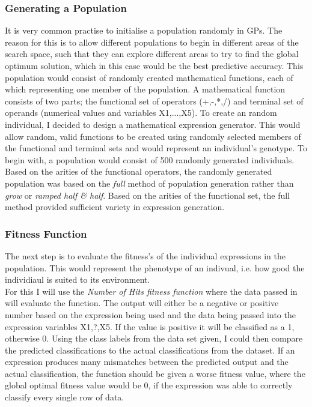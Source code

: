 \documentclass[11pt]{article}
\begin{document}
\subsubsection{Generating a Population}
It is very common practise to initialise a population randomly in GPs. The reason for this is to allow different populations to begin in different areas of the search space, such that they can explore different areas to try to find the global optimum solution, which in this case would be the best predictive accuracy.  This population would consist of randomly created mathematical functions, each of which representing one member of the population. A mathematical function consists of two parts; the functional set of operators (+,-,*,/) and terminal set of operands (numerical values and variables X1,...,X5). To create an random individual, I decided to design a mathematical expression generator. This would allow random, valid functions to be created using randomly selected members of the functional and terminal sets and would represent an individual's genotype. To begin with, a population would consist of 500 randomly generated individuals. Based on the arities of the functional operators, the randomly generated population was based on the \textit{full} method of population generation\cite{?} rather than \textit{grow} or \textit{ramped half \& half}\cite{?}. Based on the arities of the functional set, the full method provided sufficient variety in expression generation.
\subsubsection{Fitness Function}
The next step is to evaluate the fitness's of the individual expressions in the population. This would represent the phenotype of an indivual, i.e. how good the individiaul is suited to its environment. \\
 For this I will use the \textit{Number of Hits fitness function}\cite{?} where the data passed in will evaluate the function. The output will either be a negative or positive number based on the expression being used and the data being passed into the expression variables X1,?,X5. If the value is positive it will be classified as a 1, otherwise 0. Using the class labels from the data set given, I could then compare the predicted classifications to the actual classifications from the dataset. If an expression produces many mismatches between the predicted output and the actual classification, the function should be given a worse fitness value, where the global optimal fitness value would be 0, if the expression was able to correctly classify every single row of data.
\end{document}
